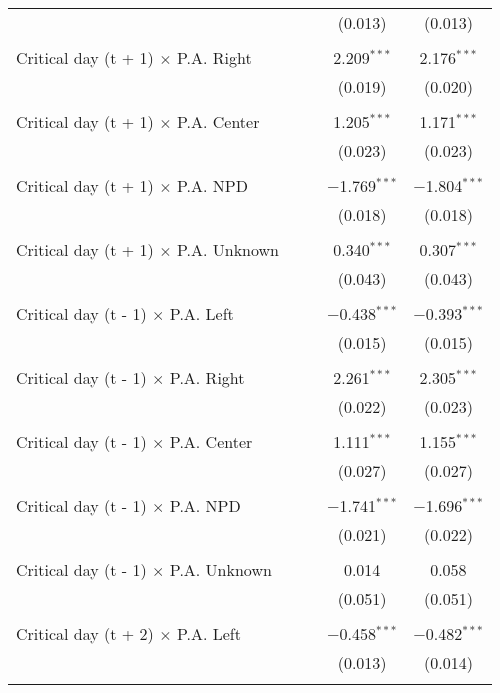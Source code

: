 \documentclass[
]{article}
\begin{document}
\begin{table}[!htbp]
{\begin{tabular}{@{\extracolsep{5pt}}lcccc}
  &  &  & (0.013) & (0.013) \\ 
  & & & & \\ 
 Critical day (t + 1) $\times$ P.A. Right &  &  & 2.209$^{***}$ & 2.176$^{***}$ \\ 
  &  &  & (0.019) & (0.020) \\ 
  & & & & \\ 
 Critical day (t + 1) $\times$ P.A. Center &  &  & 1.205$^{***}$ & 1.171$^{***}$ \\ 
  &  &  & (0.023) & (0.023) \\ 
  & & & & \\ 
 Critical day (t + 1) $\times$ P.A. NPD &  &  & $-$1.769$^{***}$ & $-$1.804$^{***}$ \\ 
  &  &  & (0.018) & (0.018) \\ 
  & & & & \\ 
 Critical day (t + 1) $\times$ P.A. Unknown &  &  & 0.340$^{***}$ & 0.307$^{***}$ \\ 
  &  &  & (0.043) & (0.043) \\ 
  & & & & \\ 
 Critical day (t - 1) $\times$ P.A. Left &  &  & $-$0.438$^{***}$ & $-$0.393$^{***}$ \\ 
  &  &  & (0.015) & (0.015) \\ 
  & & & & \\ 
 Critical day (t - 1) $\times$ P.A. Right &  &  & 2.261$^{***}$ & 2.305$^{***}$ \\ 
  &  &  & (0.022) & (0.023) \\ 
  & & & & \\ 
 Critical day (t - 1) $\times$ P.A. Center &  &  & 1.111$^{***}$ & 1.155$^{***}$ \\ 
  &  &  & (0.027) & (0.027) \\ 
  & & & & \\ 
 Critical day (t - 1) $\times$ P.A. NPD &  &  & $-$1.741$^{***}$ & $-$1.696$^{***}$ \\ 
  &  &  & (0.021) & (0.022) \\ 
  & & & & \\ 
 Critical day (t - 1) $\times$ P.A. Unknown &  &  & 0.014 & 0.058 \\ 
  &  &  & (0.051) & (0.051) \\ 
  & & & & \\ 
 Critical day (t + 2) $\times$ P.A. Left &  &  & $-$0.458$^{***}$ & $-$0.482$^{***}$ \\ 
  &  &  & (0.013) & (0.014) \\ 
  & & & & \\ 

\end{tabular}}
\end{table}
\end{document}
